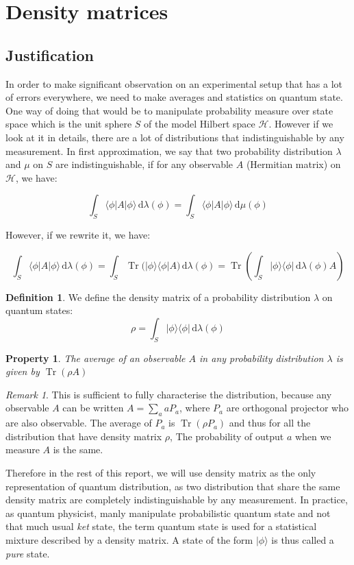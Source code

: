 \documentclass[10pt]{report}
\theoremstyle{plain}
\newtheorem{prop}[thm]{Property}
\theoremstyle{definition}
\newtheorem{defn}{Definition}[chapter]
\theoremstyle{remark}
\newtheorem*{rem}{Remark}
\newcommand{\ket}[1]{|#1\rangle}
\newcommand{\bra}[1]{\langle#1|}
\newcommand{\dd}{\mathrm{d}}
\DeclareMathOperator{\Tr}{Tr}
\begin{document}
\section{Density matrices}

\subsection{Justification}

In order to make significant observation on an experimental setup that has a lot
of errors everywhere, we need to make averages and statistics on quantum state.
One way of doing that would be to manipulate probability measure over state
space which is the unit sphere $S$ of the model Hilbert space $\mathcal{H}$. However if we look at
it in details, there are a lot of distributions that indistinguishable by any
measurement. In first approximation, we say that two probability distribution
$\lambda$ and $\mu$ on $S$ are indistinguishable,
if for any observable $A$ (Hermitian matrix) on $\mathcal{H}$, we
have:

\[\int_S \bra \phi A \ket \phi\,\dd \lambda(\phi) = \int_S \bra \phi A \ket
  \phi\,\dd \mu(\phi) \]

However, if we rewrite it, we have:

\[\int_S \bra \phi A \ket \phi\,\dd \lambda(\phi)
  = \int_S \Tr\big(\ket \phi \bra \phi A\big) \,\dd \lambda(\phi)
  = \Tr\left(\int_S \ket \phi \bra \phi \,\dd \lambda(\phi) A \right)\]

\begin{defn} We define the density matrix of a probability distribution $\lambda$ on
  quantum states:
  \[ \rho = \int_S \ket \phi \bra \phi \,\dd\lambda(\phi) \]
\end{defn}
\begin{prop}
  The average of an observable $A$ in any probability distribution $\lambda$ is
  given by $\Tr(\rho A)$
\end{prop}

\begin{rem} This is sufficient to fully characterise the distribution, because
 any observable $A$ can be written $A = \sum_a aP_a$, where $P_a$ are orthogonal
 projector who are also observable. The average of $P_a$ is $\Tr(\rho P_a)$ and
 thus for all the distribution that have density matrix $\rho$, The probability
 of output $a$ when we measure $A$ is the same.
\end{rem}

Therefore in the rest of this report, we will use density matrix as the only
representation of quantum distribution, as two distribution that share the same
density matrix are completely indistinguishable by any measurement. In practice,
as quantum physicist, manly manipulate probabilistic quantum state and not that
much usual \emph{ket} state, the term quantum state is used for a statistical
mixture described by a density matrix. A state of the form $\ket \phi$ is thus
called a \emph{pure} state.
\end{document}
